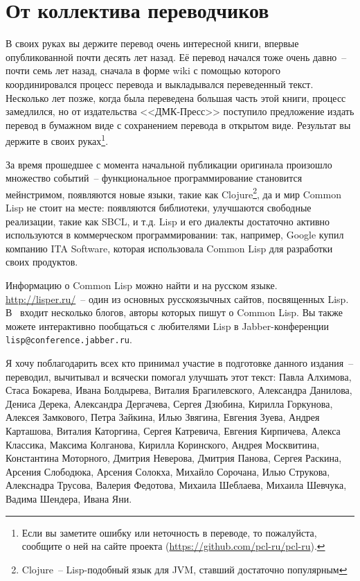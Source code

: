\chapter*{От коллектива переводчиков}

В своих руках вы держите перевод очень интересной книги, впервые опубликованной почти
десять лет назад.  Её перевод начался тоже очень давно~-- почти семь лет назад, сначала в
форме wiki с помощью которого координировался процесс перевода и выкладывался переведенный
текст.  Несколько лет позже, когда была переведена большая часть этой книги, процесс
замедлился, но от издательства <<ДМК-Пресс>> поступило предложение издать перевод в
бумажном виде с сохранением перевода в открытом виде.  Результат вы держите в своих
руках\footnote{Если вы заметите ошибку или неточность в переводе, то пожалуйста, сообщите
  о ней на сайте проекта (\url{https://github.com/pcl-ru/pcl-ru}).}\hspace{\footnotenegspace}.

За время прошедшее с момента начальной публикации оригинала произошло множество событий~--
функциональное программирование становится мейнстримом, появляются новые языки, такие как
Clojure\footnote{Clojure~-- Lisp-подобный язык для JVM, ставший достаточно популярным}, да
и мир Common Lisp не стоит на месте: появляются библиотеки, улучшаются свободные
реализации, такие как SBCL, и т.д.  Lisp и его диалекты достаточно активно используются в
коммерческом программировании: так, например, Google купил компанию ITA Software, которая
использовала Common Lisp для разработки своих продуктов.

Информацию о Common Lisp можно найти и на русском языке.
\mbox{\url{http://lisper.ru/}}~-- один из основных русскоязычных сайтов, посвященных Lisp.
В~
входит несколько блогов, авторы которых пишут о Common Lisp.  Вы также можете интерактивно
пообщаться с любителями Lisp в Jabber-конференции \verb|lisp@conference.jabber.ru|.

Я хочу поблагодарить всех кто принимал участие в подготовке данного издания~-- переводил,
вычитывал и всячески помогал улучшать этот текст: Павла Алхимова, Стаса Бокарева, Ивана
Болдырева, Виталия Брагилевского, Александра Данилова, Дениса Дерека, Александра
Дергачева, Сергея Дзюбина, Кирилла Горкунова, Алексея Замкового, Петра Зайкина, Илью
Звягина, Евгения Зуева, Андрея Карташова, Виталия Каторгина, Сергея Катревича, Евгения
Кирпичева, Алекса Классика, Максима Колганова, Кирилла Коринского, Андрея Москвитина,
Константина Моторного, Дмитрия Неверова, Дмитрия Панова, Сергея Раскина, Арсения
Слободюка, Арсения Солокха, Михайло Сорочана, Илью Струкова, Алекснадра Трусова, Валерия
Федотова, Михаила Шеблаева, Михаила Шевчука, Вадима Шендера, Ивана Яни.


